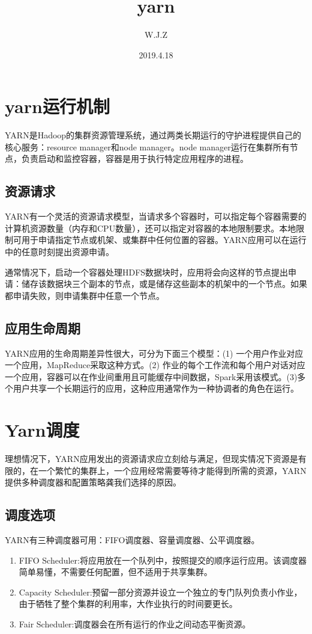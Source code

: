 \documentclass[a4paper]{article}
\title{yarn}
\author{W.J.Z}
\date{2019.4.18}
\begin{document}
	\maketitle
	\section{yarn运行机制}
	YARN是Hadoop的集群资源管理系统，通过两类长期运行的守护进程提供自己的核心服务：resource manager和node manager。node manager运行在集群所有节点，负责启动和监控容器，容器是用于执行特定应用程序的进程。
	\subsection{资源请求}
	YARN有一个灵活的资源请求模型，当请求多个容器时，可以指定每个容器需要的计算机资源数量（内存和CPU数量），还可以指定对容器的本地限制要求。本地限制可用于申请指定节点或机架、或集群中任何位置的容器。YARN应用可以在运行中的任意时刻提出资源申请。
	
	通常情况下，启动一个容器处理HDFS数据块时，应用将会向这样的节点提出申请：储存该数据块三个副本的节点，或是储存这些副本的机架中的一个节点。如果都申请失败，则申请集群中任意一个节点。
	
	\subsection{应用生命周期}
	YARN应用的生命周期差异性很大，可分为下面三个模型：(1) 一个用户作业对应一个应用，MapReduce采取这种方式。(2) 作业的每个工作流和每个用户对话对应一个应用，容器可以在作业间重用且可能缓存中间数据，Spark采用该模式。(3)多个用户共享一个长期运行的应用，这种应用通常作为一种协调者的角色在运行。
	
	\section{Yarn调度}
	理想情况下，YARN应用发出的资源请求应立刻给与满足，但现实情况下资源是有限的，在一个繁忙的集群上，一个应用经常需要等待才能得到所需的资源，YARN提供多种调度器和配置策略龚我们选择的原因。
	
	\subsection{调度选项}
	YARN有三种调度器可用：FIFO调度器、容量调度器、公平调度器。
	\begin{enumerate}
		\item FIFO Scheduler:将应用放在一个队列中，按照提交的顺序运行应用。该调度器简单易懂，不需要任何配置，但不适用于共享集群。
		
		\item Capacity Scheduler:预留一部分资源并设立一个独立的专门队列负责小作业，由于牺牲了整个集群的利用率，大作业执行的时间要更长。
		
		\item Fair Scheduler:调度器会在所有运行的作业之间动态平衡资源。
	\end{enumerate}
	
\end{document}
